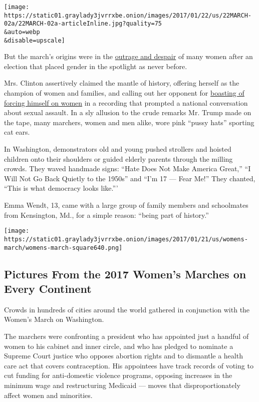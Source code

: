 \texttt{[image: https://static01.graylady3jvrrxbe.onion/images/2017/01/22/us/22MARCH-02a/22MARCH-02a-articleInline.jpg?quality=75\\\&auto=webp\\\&disable=upscale]}

But the march's origins were in the
\href{https://www.nytimes3xbfgragh.onion/2016/12/30/opinion/sunday/feminism-lost-now-what.html}{outrage
and despair} of many women after an election that placed gender in the
spotlight as never before.

Mrs. Clinton assertively claimed the mantle of history, offering herself
as the champion of women and families, and calling out her opponent for
\href{https://www.nytimes3xbfgragh.onion/2016/10/08/us/politics/donald-trump-women.html}{boasting
of forcing himself on women} in a recording that prompted a national
conversation about sexual assault. In a sly allusion to the crude
remarks Mr. Trump made on the tape, many marchers, women and men alike,
wore pink ``pussy hats'' sporting cat ears.

In Washington, demonstrators old and young pushed strollers and hoisted
children onto their shoulders or guided elderly parents through the
milling crowds. They waved handmade signs: ``Hate Does Not Make America
Great,'' ``I Will Not Go Back Quietly to the 1950s'' and ``I'm 17 ---
Fear Me!'' They chanted, ``This is what democracy looks like.'''

Emma Wendt, 13, came with a large group of family members and
schoolmates from Kensington, Md., for a simple reason: ``being part of
history.''

\href{https://www.nytimes3xbfgragh.onion/interactive/2017/01/21/world/womens-march-pictures.html}{}

\texttt{[image: https://static01.graylady3jvrrxbe.onion/images/2017/01/21/us/womens-march/womens-march-square640.png]}

\hypertarget{pictures-from-the-2017-womens-marches-on-every-continent}{%
\subsection{Pictures From the 2017 Women's Marches on Every
Continent}\label{pictures-from-the-2017-womens-marches-on-every-continent}}

Crowds in hundreds of cities around the world gathered in conjunction
with the Women's March on Washington.

The marchers were confronting a president who has appointed just a
handful of women to his cabinet and inner circle, and who has pledged to
nominate a Supreme Court justice who opposes abortion rights and to
dismantle a health care act that covers contraception. His appointees
have track records of voting to cut funding for anti-domestic violence
programs, opposing increases in the minimum wage and restructuring
Medicaid --- moves that disproportionately affect women and minorities.

